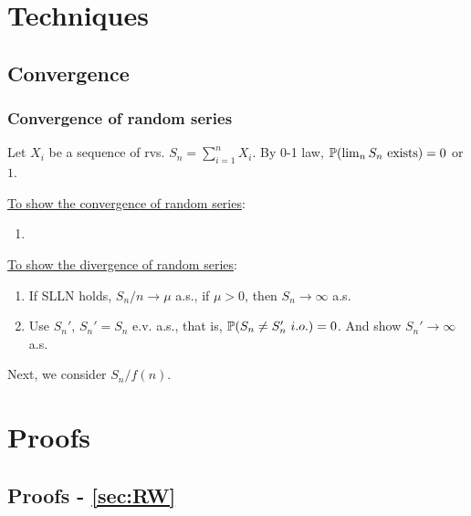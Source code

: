 \documentclass[10pt,a4paper]{article}
\begin{document}
\section{Techniques}\label{sec:techniques}
\subsection{Convergence}\label{sec:tech-cvg}
\subsubsection{Convergence of random series}\label{sec:tech-cvg-rseries}
Let $X_i$ be a sequence of rvs. $S_n=\sum_{i=1}^{n}X_i$. By 0-1 law, $\mathbb P(\lim_{n}S_n \text{ exists})=0$ or $1$.   

\underline{To show the convergence of random series}:
\begin{enumerate}
	\item 
\end{enumerate}

\underline{To show the divergence of random series}:
\begin{enumerate}
	\item If SLLN holds, $S_n/n \to \mu$ a.s., if $\mu>0$, then $S_n\to \infty$ a.s.
	\item Use $S_n'$, $S_n'=S_n$ e.v. a.s., that is, $\bbP(S_n\neq S_n' \ i.o.)=0$. And show $S_n'\to \infty $ a.s.   
\end{enumerate}

Next, we consider $S_n/f(n)$. 


\appendix
\section{Proofs}\label{sec:proof}
\subsection{Proofs - \ref{sec:RW}}\label{sec:proof-RW}
\end{document}
